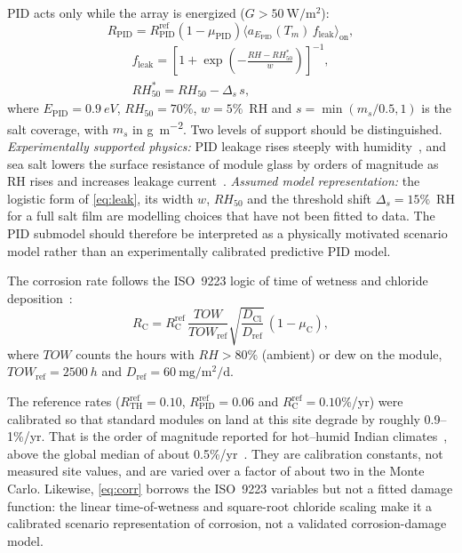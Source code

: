 \documentclass[journal]{IEEEtran}
\newcommand{\TOWsym}{\mathit{TOW}}
\begin{document}
PID acts only while the array is energized ($G>\SI{50}{\watt\per\square\metre}$):
\begin{equation}
R_{\mathrm{PID}} = R_{\mathrm{PID}}^{\mathrm{ref}}(1-\mu_{\mathrm{PID}})
\bigl\langle a_{E_{\mathrm{PID}}}(T_m)\,f_{\mathrm{leak}}\bigr\rangle_{\mathrm{on}},
\label{eq:pid}
\end{equation}
\begin{equation}
\begin{gathered}
f_{\mathrm{leak}} = \left[1+\exp\left(-\frac{\mathit{RH} - \mathit{RH}_{50}^{*}}{w}\right)\right]^{-1},\\
\mathit{RH}_{50}^{*} = \mathit{RH}_{50} - \Delta_s\,s,
\end{gathered}
\label{eq:leak}
\end{equation}
where $E_{\mathrm{PID}}=\SI{0.9}{eV}$, $\mathit{RH}_{50}=70\%$, $w=5\%$~RH and $s=\min(m_s/0.5,1)$ is the salt coverage,
with $m_s$ in \si{\gram\per\square\metre}. Two levels
of support should be distinguished. \emph{Experimentally supported physics:} PID leakage rises steeply with
humidity~\cite{hoffmann2014,luo2017}, and sea salt lowers the surface resistance of module glass by orders of magnitude
as RH rises and increases leakage current~\cite{hacke2015,islam2018}. \emph{Assumed model representation:} the
logistic form of \eqref{eq:leak}, its width $w$, $\mathit{RH}_{50}$ and the threshold shift $\Delta_s=15\%$~RH for
a full salt film are modelling choices that have not been fitted to data. The PID submodel should therefore be
interpreted as a physically motivated scenario model rather than an experimentally calibrated predictive PID model.

The corrosion rate follows the ISO~9223 logic of time of wetness and chloride deposition~\cite{iso9223}:
\begin{equation}
R_{\mathrm{C}} = R_{\mathrm{C}}^{\mathrm{ref}}\,\frac{\TOWsym}{\TOWsym_{\mathrm{ref}}}
\sqrt{\frac{D_{\mathrm{Cl}}}{D_{\mathrm{ref}}}}\,(1-\mu_{\mathrm{C}}),
\label{eq:corr}
\end{equation}
where $\TOWsym$ counts the hours with $\mathit{RH}>80\%$ (ambient) or dew on the module, $\TOWsym_{\mathrm{ref}}=\SI{2500}{h}$ and
$D_{\mathrm{ref}}=\SI{60}{\milli\gram\per\square\metre\per\day}$.

The reference rates ($R_{\mathrm{TH}}^{\mathrm{ref}}=0.10$, $R_{\mathrm{PID}}^{\mathrm{ref}}=0.06$ and
$R_{\mathrm{C}}^{\mathrm{ref}}=0.10$\%/yr) were calibrated so that standard modules on land at this site degrade by
roughly 0.9--1\%/yr. That is the order of magnitude reported for hot--humid Indian climates~\cite{dubey2014}, above
the global median of about 0.5\%/yr~\cite{jordan2013}. They are calibration constants, not measured site values, and
are varied over a factor of about two in the Monte Carlo. Likewise, \eqref{eq:corr} borrows the ISO~9223 variables but
not a fitted damage function: the linear time-of-wetness and square-root chloride scaling make it a calibrated scenario
representation of corrosion, not a validated corrosion-damage model.
\end{document}
